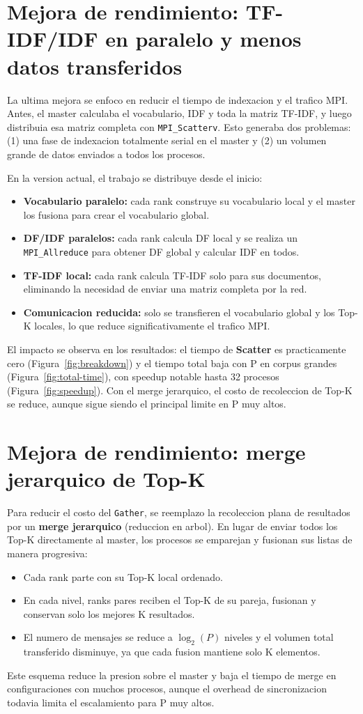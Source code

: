 \documentclass[11pt]{article}
\begin{document}
\section{Mejora de rendimiento: TF-IDF/IDF en paralelo y menos datos transferidos}
La ultima mejora se enfoco en reducir el tiempo de indexacion y el trafico MPI.
Antes, el master calculaba el vocabulario, IDF y toda la matriz TF-IDF, y luego
distribuia esa matriz completa con \texttt{MPI\_Scatterv}. Esto generaba dos
problemas: (1) una fase de indexacion totalmente serial en el master y
(2) un volumen grande de datos enviados a todos los procesos.

En la version actual, el trabajo se distribuye desde el inicio:
\begin{itemize}
  \item \textbf{Vocabulario paralelo:} cada rank construye su vocabulario local
  y el master los fusiona para crear el vocabulario global.
  \item \textbf{DF/IDF paralelos:} cada rank calcula DF local y se realiza un
  \texttt{MPI\_Allreduce} para obtener DF global y calcular IDF en todos.
  \item \textbf{TF-IDF local:} cada rank calcula TF-IDF solo para sus documentos,
  eliminando la necesidad de enviar una matriz completa por la red.
  \item \textbf{Comunicacion reducida:} solo se transfieren el vocabulario global
  y los Top-K locales, lo que reduce significativamente el trafico MPI.
\end{itemize}

El impacto se observa en los resultados: el tiempo de \textbf{Scatter} es
practicamente cero (Figura~\ref{fig:breakdown}) y el tiempo total baja con P en
corpus grandes (Figura~\ref{fig:total-time}), con speedup notable hasta 32
procesos (Figura~\ref{fig:speedup}). Con el merge jerarquico, el costo de
recoleccion de Top-K se reduce, aunque sigue siendo el principal limite en
P muy altos.

\section{Mejora de rendimiento: merge jerarquico de Top-K}
Para reducir el costo del \texttt{Gather}, se reemplazo la recoleccion plana
de resultados por un \textbf{merge jerarquico} (reduccion en arbol). En lugar
de enviar todos los Top-K directamente al master, los procesos se emparejan y
fusionan sus listas de manera progresiva:
\begin{itemize}
  \item Cada rank parte con su Top-K local ordenado.
  \item En cada nivel, ranks pares reciben el Top-K de su pareja, fusionan y
  conservan solo los mejores K resultados.
  \item El numero de mensajes se reduce a $\log_2(P)$ niveles y el volumen total
  transferido disminuye, ya que cada fusion mantiene solo K elementos.
\end{itemize}
Este esquema reduce la presion sobre el master y baja el tiempo de merge en
configuraciones con muchos procesos, aunque el overhead de sincronizacion
todavia limita el escalamiento para P muy altos.
\end{document}
